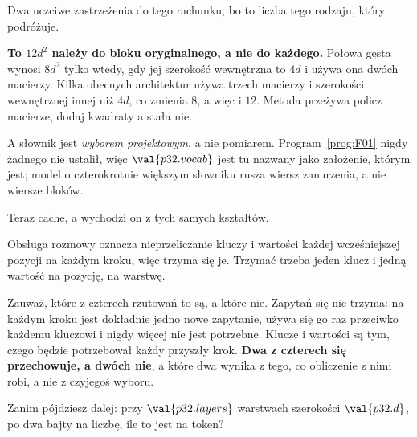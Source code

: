 \begin{fr}
Dwa uczciwe zastrzeżenia do tego rachunku, bo to liczba tego rodzaju, który
podróżuje.

\begin{warning}
\textbf{To $12d^{2}$ należy do bloku oryginalnego, a nie do każdego.} Połowa
gęsta wynosi $8d^{2}$ tylko wtedy, gdy jej szerokość wewnętrzna to $4d$ i
używa ona dwóch macierzy. Kilka obecnych architektur używa trzech macierzy i
szerokości wewnętrznej innej niż $4d$, co zmienia $8$, a więc i $12$. Metoda
przeżywa \dash{} policz macierze, dodaj kwadraty \dash{} a stała nie.

A słownik jest \emph{wyborem projektowym}, a nie pomiarem.
Program~\ref{prog:F01} nigdy żadnego nie ustalił, więc $\val{p32.vocab}$ jest
tu nazwany jako założenie, którym jest; model o czterokrotnie większym
słowniku rusza wiersz zanurzenia, a nie wiersze bloków.
\end{warning}
\end{fr}

\begin{fr}
Teraz cache, a wychodzi on z tych samych kształtów.

Obsługa rozmowy oznacza nieprzeliczanie kluczy i wartości każdej wcześniejszej
pozycji na każdym kroku, więc trzyma się je. Trzymać trzeba jeden klucz i
jedną wartość na pozycję, na warstwę.

Zauważ, które z czterech rzutowań to są, a które nie. Zapytań się nie trzyma:
na każdym kroku jest dokładnie jedno nowe zapytanie, używa się go raz
przeciwko każdemu kluczowi i nigdy więcej nie jest potrzebne. Klucze i
wartości są tym, czego będzie potrzebował każdy przyszły krok. \textbf{Dwa z
czterech się przechowuje, a dwóch nie}, a które dwa \dash{} wynika z tego, co
obliczenie z nimi robi, a nie z czyjegoś wyboru.

Zanim pójdziesz dalej: przy $\val{p32.layers}$ warstwach szerokości
$\val{p32.d}$, po dwa bajty na liczbę, ile to jest na token?
\dotline
\nextframe
\end{fr}

